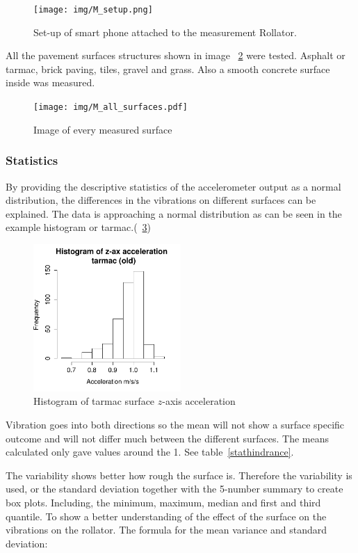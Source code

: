 \begin{figure}[h]
\texttt{[image: img/M\_setup.png]}
\centering
\caption{ Set-up of smart phone attached to the measurement Rollator. \label{setup2}}
\end{figure}

All the pavement surfaces structures shown in image ~\ref{surfaceimg} were tested. Asphalt or tarmac, brick paving, tiles, gravel and grass. Also a smooth concrete surface inside was measured. 

\begin{figure}[h]
\texttt{[image: img/M\_all\_surfaces.pdf]}
\centering
\caption{Image of every measured surface \label{surfaceimg}}
\end{figure}
\clearpage

\subsubsection{Statistics}
By providing the descriptive statistics of the accelerometer output as a normal distribution, the differences in the vibrations on different surfaces can be explained. The data is approaching a normal distribution as can be seen in the example histogram or tarmac.(~\ref{hist})
\begin{figure}[!h]
\includegraphics[width=0.5\textwidth]{img/M_hist_tarmac_old.pdf}
\centering
\caption{Histogram of tarmac surface $z$-axis acceleration \label{hist}}
\end{figure}

Vibration goes into both directions so the mean will not show a surface specific outcome and will not differ much between the different surfaces. The means calculated only gave values around the 1. See table~\ref{stathindrance}.

The variability shows better how rough the surface is. Therefore the variability is used, or the standard deviation together with the 5-number summary to create box plots. Including, the minimum, maximum, median and first and third quantile. To show a better understanding of the effect of the surface on the vibrations on the rollator. The formula for the mean variance and standard deviation:

